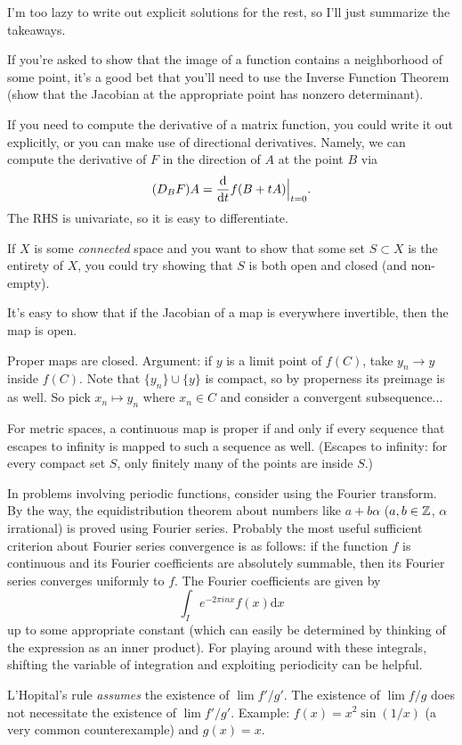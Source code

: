 I'm too lazy to write out explicit solutions for the rest, so I'll just summarize the takeaways.

If you're asked to show that the image of a function contains a neighborhood of some point, it's a good bet that you'll need to use the Inverse Function Theorem (show that the Jacobian at the appropriate point has nonzero determinant).

If you need to compute the derivative of a matrix function, you could write it out explicitly, or you can make use of directional derivatives. Namely, we can compute the derivative of $F$ in the direction of $A$ at the point $B$ via
\[
	(D_B F) A = \deriv[t] f(B+tA) \Big\rvert_{t=0}.
\]
The RHS is univariate, so it is easy to differentiate.

If $X$ is some \emph{connected} space and you want to show that some set $S \subset X$ is the entirety of $X$, you could try showing that $S$ is both open and closed (and non-empty).

It's easy to show that if the Jacobian of a map is everywhere invertible, then the map is open.

Proper maps are closed. Argument: if $y$ is a limit point of $f(C)$, take $y_n \to y$ inside $f(C)$. Note that $\{y_n\} \cup \{y\}$ is compact, so by properness its preimage is as well. So pick $x_n \mapsto y_n$ where $x_n \in C$ and consider a convergent subsequence...

For metric spaces, a continuous map is proper if and only if every sequence that escapes to infinity is mapped to such a sequence as well. (Escapes to infinity: for every compact set $S$, only finitely many of the points are inside $S$.)

In problems involving periodic functions, consider using the Fourier transform. By the way, the equidistribution theorem about numbers like $a+b\alpha$ ($a,b\in\mathbb{Z}$, $\alpha$ irrational) is proved using Fourier series. Probably the most useful sufficient criterion about Fourier series convergence is as follows: if the function $f$ is continuous and its Fourier coefficients are absolutely summable, then its Fourier series converges uniformly to $f$. The Fourier coefficients are given by
\[
	\int_I e^{-2\pi i n x} f(x) \mathrm{d} x
\]
up to some appropriate constant (which can easily be determined by thinking of the expression as an inner product). For playing around with these integrals, shifting the variable of integration and exploiting periodicity can be helpful.

L'Hopital's rule \emph{assumes} the existence of $\lim f'/g'$. The existence of $\lim f/g$ does not necessitate the existence of $\lim f'/g'$. Example: $f(x) = x^2 \sin(1/x)$ (a very common counterexample) and $g(x)=x$.